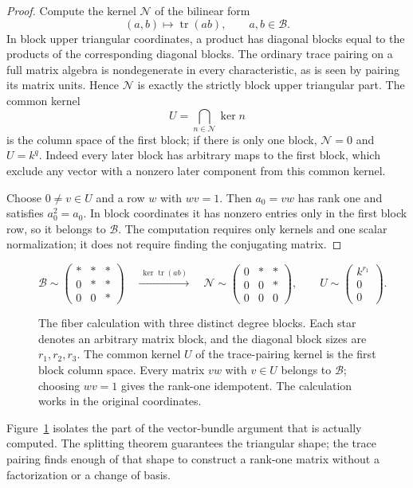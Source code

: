 \begin{proof}
Compute the kernel $\mathcal N$ of the bilinear form
\[
 (a,b)\longmapsto\operatorname{tr}(ab),\qquad a,b\in\mathcal B.
\]
In block upper triangular coordinates, a product has diagonal blocks
equal to the products of the corresponding diagonal blocks.  The
ordinary trace pairing on a full matrix algebra is nondegenerate in
every characteristic, as is seen by pairing its matrix units.
Hence $\mathcal N$ is exactly the strictly block upper triangular
part.  The common kernel
\[
 U=\bigcap_{n\in\mathcal N}\ker n
\]
is the column space of the first block; if there is only one block,
$\mathcal N=0$ and $U=k^q$.  Indeed every later block has arbitrary
maps to the first block, which exclude any vector with a nonzero
later component from this common kernel.

Choose $0\ne v\in U$ and a row $w$ with $wv=1$.  Then $a_0=vw$
has rank one and satisfies $a_0^2=a_0$.  In block coordinates it has
nonzero entries only in the first block row, so it belongs to
$\mathcal B$.  The computation requires only kernels and one scalar
normalization; it does not require finding the conjugating matrix.
\end{proof}

\begin{figure}[tb]
\centering
\[
 \mathcal B\sim
 \begin{pmatrix} *&*&*\\0&*&*\\0&0&*\end{pmatrix}
 \quad\xrightarrow{\ \ker\operatorname{tr}(ab)\ }\quad
 \mathcal N\sim
 \begin{pmatrix}0&*&*\\0&0&*\\0&0&0\end{pmatrix},
 \qquad
 U\sim\begin{pmatrix}k^{r_1}\\0\\0\end{pmatrix}.
\]
\caption{The fiber calculation with three distinct degree blocks.
Each star denotes an arbitrary matrix block, and the diagonal block
sizes are $r_1,r_2,r_3$.  The common kernel $U$ of the trace-pairing
kernel is the first block column space.  Every matrix $vw$ with
$v\in U$ belongs to $\mathcal B$; choosing $wv=1$ gives the rank-one
idempotent.  The calculation works in the original coordinates.}
\label{fig:norm-fiber}
\end{figure}

Figure~\ref{fig:norm-fiber} isolates the part of the vector-bundle
argument that is actually computed.  The splitting theorem guarantees
the triangular shape; the trace pairing finds enough of that shape
to construct a rank-one matrix without a factorization or a change
of basis.

